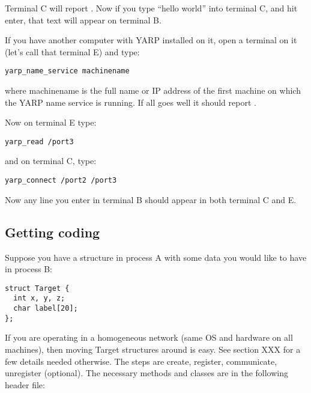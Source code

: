 Terminal C will report .  Now if
you type ``hello world'' into terminal C, and hit enter, that text
will appear on terminal B.

If you have another computer with YARP installed on it, open a
terminal on it (let's call that terminal E) and type:

\begin{verbatim}
yarp_name_service machinename
\end{verbatim}

where machinename is the full name or IP address of the first machine
on which the YARP name service is running.  If all goes well it should
report .

Now on terminal E type:
%
\begin{verbatim}
yarp_read /port3
\end{verbatim}
%
and on terminal C, type:
%
\begin{verbatim}
yarp_connect /port2 /port3
\end{verbatim}
%
Now any line you enter in terminal B should appear in both terminal C and E.



\subsection{Getting coding}

Suppose you have a structure  in process A with some data
you would like to have in process B:
%
\begin{verbatim}
struct Target {
  int x, y, z;
  char label[20];
};
\end{verbatim}
%
If you are operating in a homogeneous network (same OS and hardware on
all machines), then moving Target structures around is easy.  See
section XXX for a few details needed otherwise.
%
The steps are create, register, communicate, unregister (optional).
The necessary methods and classes are in the following header file:

